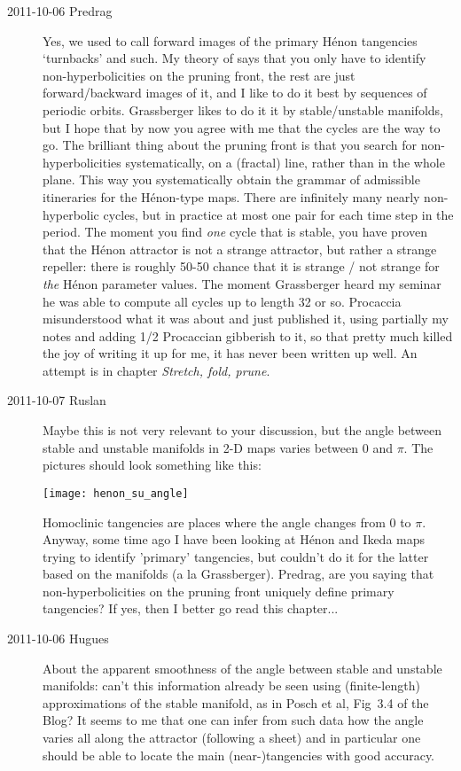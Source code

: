 \begin{description}
\item[2011-10-06 Predrag]
Yes, we used to call forward images of the primary H\'enon tangencies
`turnbacks' and such. My theory of
 says that you only have to identify non-hyperbolicities on the
pruning front, the rest are just forward/backward images of it, and I
like to do it best by sequences of periodic orbits. Grassberger likes to
do it it by stable/unstable manifolds, but I hope that by now you agree
with me that the cycles are the way to go. The brilliant thing about the
pruning front is that you search for non-hyperbolicities systematically,
on a (fractal) line, rather than in the whole plane. This way you
systematically obtain the grammar of admissible itineraries for the
H\'enon-type maps. There are infinitely many nearly non-hyperbolic
cycles, but in practice at most one pair for each time step in the
period. The moment you find \emph{one} cycle that is stable, you have
proven that the H\'enon attractor is not a strange attractor, but rather
a strange repeller: there is roughly 50-50 chance that it is strange /
not strange for \emph{the} H\'enon parameter values. The moment
Grassberger heard my seminar he was able to compute all cycles up to
length 32 or so. Procaccia misunderstood what it was about and just
published it, using partially my notes and adding 1/2
Procaccian gibberish to it, so that pretty much killed the joy of writing
it up for me, it has never been written up well. An attempt is in
 chapter
{\em Stretch, fold, prune}.

\item[2011-10-07 Ruslan] Maybe this is not very relevant to your discussion, but the angle between stable and unstable manifolds in 2-D maps varies between $0$ and $\pi$.  The pictures should look something like this:
    
    \texttt{[image: henon\_su\_angle]}

    Homoclinic tangencies are places where the angle changes from $0$ to $\pi$.  Anyway, some time ago I have been looking at H\'enon and Ikeda maps trying to identify 'primary' tangencies, but couldn't do it for the latter based on the manifolds (a la Grassberger).  Predrag, are you saying that non-hyperbolicities on the pruning front uniquely define primary tangencies?  If yes, then I better go read this chapter...

\item[2011-10-06 Hugues]
About the apparent smoothness of the angle between stable and unstable
manifolds: can't this information already be seen using (finite-length)
approximations of the stable manifold, as in Posch et al, Fig~3.4 of the
Blog? It seems to me that one can infer from such data how the angle
varies all along the attractor (following a sheet) and in particular one
should be able to locate the main (near-)tangencies with good accuracy.


\end{description}
